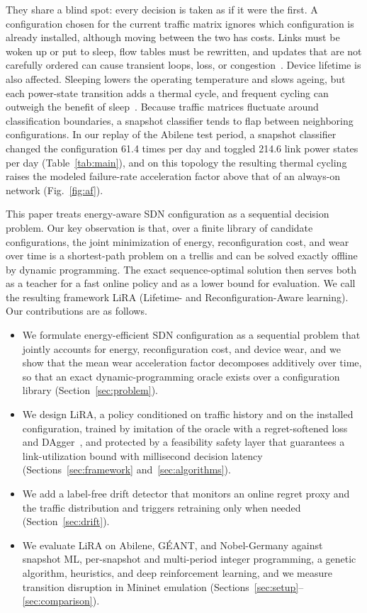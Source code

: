 \documentclass[conference]{IEEEtran}
\begin{document}
They share a blind spot: every decision is taken as if it were the first. A configuration chosen for the current traffic matrix ignores which configuration is already installed, although moving between the two has costs. Links must be woken up or put to sleep, flow tables must be rewritten, and updates that are not carefully ordered can cause transient loops, loss, or congestion~\cite{reitblatt2012abstractions,jin2014dionysus}. Device lifetime is also affected. Sleeping lowers the operating temperature and slows ageing, but each power-state transition adds a thermal cycle, and frequent cycling can outweigh the benefit of sleep~\cite{chiaraviglio2015lifetime,chiaraviglio2014impact}. Because traffic matrices fluctuate around classification boundaries, a snapshot classifier tends to flap between neighboring configurations. In our replay of the Abilene test period, a snapshot classifier changed the configuration 61.4 times per day and toggled 214.6 link power states per day (Table~\ref{tab:main}), and on this topology the resulting thermal cycling raises the modeled failure-rate acceleration factor above that of an always-on network (Fig.~\ref{fig:af}).

This paper treats energy-aware SDN configuration as a sequential decision problem. Our key observation is that, over a finite library of candidate configurations, the joint minimization of energy, reconfiguration cost, and wear over time is a shortest-path problem on a trellis and can be solved exactly offline by dynamic programming. The exact sequence-optimal solution then serves both as a teacher for a fast online policy and as a lower bound for evaluation. We call the resulting framework LiRA (Lifetime- and Reconfiguration-Aware learning). Our contributions are as follows.

\begin{itemize}
\item We formulate energy-efficient SDN configuration as a sequential problem that jointly accounts for energy, reconfiguration cost, and device wear, and we show that the mean wear acceleration factor decomposes additively over time, so that an exact dynamic-programming oracle exists over a configuration library (Section~\ref{sec:problem}).
\item We design LiRA, a policy conditioned on traffic history and on the installed configuration, trained by imitation of the oracle with a regret-softened loss and DAgger~\cite{ross2011dagger}, and protected by a feasibility safety layer that guarantees a link-utilization bound with millisecond decision latency (Sections~\ref{sec:framework} and~\ref{sec:algorithms}).
\item We add a label-free drift detector that monitors an online regret proxy and the traffic distribution and triggers retraining only when needed (Section~\ref{sec:drift}).
\item We evaluate LiRA on Abilene, G\'{E}ANT, and Nobel-Germany against snapshot ML, per-snapshot and multi-period integer programming, a genetic algorithm, heuristics, and deep reinforcement learning, and we measure transition disruption in Mininet emulation (Sections~\ref{sec:setup}--\ref{sec:comparison}).
\end{itemize}
\end{document}
